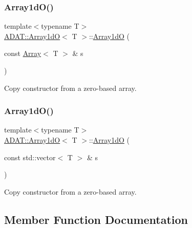 \subsubsection{\texorpdfstring{Array1dO()}{Array1dO()}\hspace{0.1cm}{\footnotesize\ttfamily [9/10]}}
{\footnotesize\ttfamily template$<$typename T$>$ \\
\mbox{\hyperlink{classADAT_1_1Array1dO}{A\+D\+A\+T\+::\+Array1dO}}$<$ T $>$\+::\mbox{\hyperlink{classADAT_1_1Array1dO}{Array1dO}} (\begin{DoxyParamCaption}\item[{const \mbox{\hyperlink{classXMLArray_1_1Array}{Array}}$<$ T $>$ \&}]{s }\end{DoxyParamCaption})\hspace{0.3cm}{\ttfamily [inline]}}



Copy constructor from a zero-\/based array. 

\mbox{\label{classADAT_1_1Array1dO_aad6c2df87d1dc941fd561fd74d181ddc}} 
\subsubsection{\texorpdfstring{Array1dO()}{Array1dO()}\hspace{0.1cm}{\footnotesize\ttfamily [10/10]}}
{\footnotesize\ttfamily template$<$typename T$>$ \\
\mbox{\hyperlink{classADAT_1_1Array1dO}{A\+D\+A\+T\+::\+Array1dO}}$<$ T $>$\+::\mbox{\hyperlink{classADAT_1_1Array1dO}{Array1dO}} (\begin{DoxyParamCaption}\item[{const std\+::vector$<$ T $>$ \&}]{s }\end{DoxyParamCaption})\hspace{0.3cm}{\ttfamily [inline]}}



Copy constructor from a zero-\/based array. 



\subsection{Member Function Documentation}
\mbox{\label{classADAT_1_1Array1dO_a387ca64e93f23d140b38bd42e81d05a8}} 
